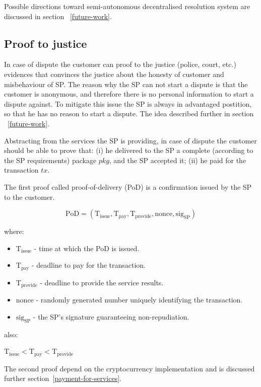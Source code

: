 \documentclass{ieeeaccess}
\begin{document}
Possible directions toward semi-autonomous decentralised resolution
system are discussed in section ~\ref{future-work}.


\subsection{Proof to justice}\label{proof-of-justice}
In case of dispute the customer can proof to the justice (police, court,
etc.) evidences that convinces the justice about the honesty of customer
and misbehaviour of SP. The reason why the SP can not start a dispute is
that the customer is anonymous, and therefore there is no personal
information to start a dispute against. To mitigate this issue the SP is
always in advantaged postition, so that he has no reason to start a
dispute. The idea described further in section ~\ref{future-work}.

Abstracting from the services the SP is providing, in case of dispute
the customer should be able to prove that: (i) he delivered to the SP a
complete (according to the SP requirements) package \(pkg\), and the SP
accepted it; (ii) he paid for the transaction \(tx\).

The first proof called proof-of-delivery (PoD) is a confirmation issued
by the SP to the customer.

\[\mathrm{PoD} = (\mathrm{T}_\mathrm{issue}, \mathrm{T}_\mathrm{pay}, \mathrm{T}_\mathrm{provide}, \mathrm{nonce}, \mathrm{sig}_\mathrm{SP})\]

where:

\begin{itemize}

\item
  \(\mathrm{T}_\mathrm{issue}\) - time at which the PoD is issued.
\item
  \(\mathrm{T}_\mathrm{pay}\) - deadline to pay for the transaction.
\item
  \(\mathrm{T}_\mathrm{provide}\) - deadline to provide the service
  results.
\item
  \(\mathrm{nonce}\) - randomly generated number uniquely identifying
  the transaction.
\item
  \(\mathrm{sig}_\mathrm{SP}\) - the SP's signature guaranteeing
  non-repudiation.
\end{itemize}

also:

\(\mathrm{T}_\mathrm{issue} < \mathrm{T}_\mathrm{pay} < \mathrm{T}_\mathrm{provide}\)

The second proof depend on the cryptocurrency implementation and is
discussed further section~\ref{payment-for-services}.
\end{document}
